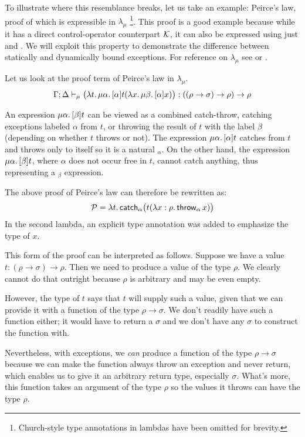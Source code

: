 To illustrate where this resemblance breaks, let us take an example: Peirce's law, 
proof of which is
expressible in $\lambda_\mu$ \cite{krebbers11}\footnote{Church-style type annotations
in lambdas have been omitted for brevity.}. This proof is a good example because while
it has a direct
control-operator counterpart $\mathcal{K}$, it can also be expressed using just 
and . We will exploit this property to demonstrate the difference between
statically and dynamically bound exceptions. For reference on $\lambda_\mu$ see
\cite{parigot92} or \cite{ariola-herbelin}.

Let us look at the proof term of Peirce's law in $\lambda_\mu$.
\[ \Gamma; \Delta \vdash_\mu 
    \big(\lambda t.\, \mu \alpha.\, [\alpha] t (\lambda x.\, \mu \beta.\, [\alpha] x) \big)
      : ((\rho \to \sigma) \to \rho) \to \rho
\]

An expression $\mu \alpha.\,[\beta]t$ can be viewed as a combined catch-throw, catching
exceptions labeled $\alpha$ from $t$, or throwing the result of $t$ with the label $\beta$
(depending on whether $t$ throws or not). The expression $\mu \alpha.\,[\alpha]t$ catches
from $t$ and throws only to itself so it is a natural $_\alpha$. On the
other hand, the expression $\mu \alpha.\,[\beta]t$, where $\alpha$ does not occur free in
$t$, cannot catch anything, thus representing a $_\beta$ expression.

The above proof of Peirce's law can therefore be rewritten as:
\[ \mathcal{P} = \lambda t.\, \mathsf{catch}_\alpha \big(t (\lambda x : \rho.\, \mathsf{throw}_\alpha\, x)\big) \]
In the second lambda, an explicit type annotation was added to emphasize the type of $x$.

This form of the proof can be interpreted as follows. Suppose we have a value
$t : (\rho \to \sigma) \to \rho$. Then we need to produce a value of the type $\rho$.
We clearly cannot do that outright because $\rho$ is arbitrary and may be even empty.

However, the type of $t$ says that $t$ will supply such a value, given that we can provide
it with a function of the type $\rho \to \sigma$. We don't readily have such a function either;
it would have to return a $\sigma$ and we don't have any $\sigma$ to construct the function with.

Nevertheless, with exceptions, we \emph{can} produce a function of the type $\rho \to \sigma$
because we can make the function always throw an exception and never return, which enables us
to give it an arbitrary return type, especially $\sigma$. What's more, this function
takes an argument of the type $\rho$ so the values it throws can have the type $\rho$.

